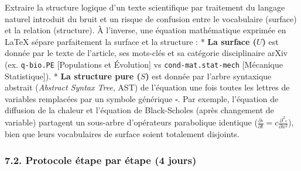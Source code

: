 \documentclass[a4paper,11pt]{article}
\begin{document}
Extraire la structure logique d'un texte scientifique par traitement du
langage naturel introduit du bruit et un risque de confusion entre le
vocabulaire (surface) et la relation (structure). À l'inverse, une
équation mathématique exprimée en LaTeX sépare parfaitement la surface
et la structure : * \textbf{La surface (\(U\))} est donnée par le texte
de l'article, ses mots-clés et sa catégorie disciplinaire arXiv (ex.
\texttt{q-bio.PE} {[}Populations et Évolution{]} vs
\texttt{cond-mat.stat-mech} {[}Mécanique Statistique{]}). * \textbf{La
structure pure (\(S\))} est donnée par l'arbre syntaxique abstrait
(\emph{Abstract Syntax Tree}, AST) de l'équation une fois toutes les
lettres de variables remplacées par un symbole générique \(\square\).
Par exemple, l'équation de diffusion de la chaleur et l'équation de
Black-Scholes (après changement de variable) partagent un sous-arbre
d'opérateurs parabolique identique
(\(\frac{\partial \square}{\partial t} = c \frac{\partial^2 \square}{\partial x^2}\)),
bien que leurs vocabulaires de surface soient totalement disjoints.

\subsubsection*{7.2. Protocole étape par étape (4 jours)}
\end{document}
